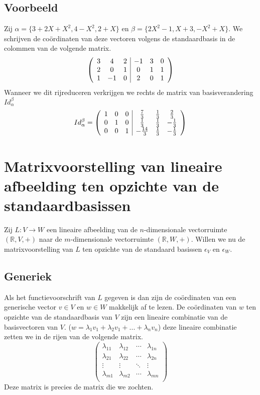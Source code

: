 \documentclass[lineaire_algebra_oplossingen.tex]{subfiles}
\begin{document}
\subsection*{Voorbeeld}
Zij $\alpha = \{3+2X+X^2,4-X^2,2+X\}$ en $\beta = \{2X^2-1,X+3,-X^2+X\}$.
We schrijven de co\"ordinaten van deze vectoren volgens de standaardbasis in de colommen van de volgende matrix.
\[
\left(
\begin{array}{c c c | c c c}
3 & 4 & 2 & -1 & 3 & 0\\
2 & 0 & 1 & 0 & 1 & 1\\
1 & -1 & 0 & 2 & 0 & 1\\
\end{array}
\right)
\]
Wanneer we dit rijreduceren verkrijgen we rechts de matrix van basisverandering $Id_\alpha^\beta$
\[
Id_\alpha^\beta =
\left(
\begin{array}{c c c | c c c}
1 & 0 & 0 & \frac{7}{3} & \frac{1}{3} & \frac{2}{3}\\
0 & 1 & 0 & \frac{1}{3} & \frac{1}{3} & -\frac{1}{3}\\
0 & 0 & 1 & -\frac{14}{3} & \frac{1}{3} & -\frac{1}{3}\\
\end{array}
\right)
\]

\section{Matrixvoorstelling van lineaire afbeelding ten opzichte van de standaardbasissen}
\label{matrixvoorstelling_van_lineaire_afbeelding_ten_opzichte_van_de_standaardbasissen}
Zij $L:V\rightarrow W$ een lineaire afbeelding van de $n$-dimensionale vectorruimte $(\mathbb{R},V,+)$ naar de $m$-dimensionale vectorruimte $(\mathbb{R},W,+)$. Willen we nu de matrixvoorstelling van $L$ ten opzichte van de standaard basissen $\epsilon_V$ en $\epsilon_W$.

\subsection*{Generiek}
Als het functievoorschrift van $L$ gegeven is dan zijn de co\"ordinaten van een generische vector $v\in V$ en $w\in W$ makkelijk af te lezen.
De co\"ordinaten van $w$ ten opzichte van de standaardbasis van $V$ zijn een lineaire combinatie van de basisvectoren van $V$. ($w = \lambda_1v_1+\lambda_2v_1+...+\lambda_nv_n$) deze lineaire combinatie zetten we in de rijen van de volgende matrix.
\[
\begin{pmatrix}
\lambda_{11} & \lambda_{12} & \cdots & \lambda_{1n} \\
\lambda_{21} & \lambda_{22} & \cdots & \lambda_{2n} \\
\vdots & \vdots & \ddots & \vdots\\
\lambda_{m1} & \lambda_{m2} & \cdots & \lambda_{mn} \\
\end{pmatrix}
\]
Deze matrix is precies de matrix die we zochten.
\end{document}
